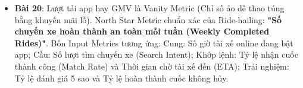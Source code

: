 \begin{dapanbox}
\begin{itemize}
    \item \textbf{Bài 20}: Lượt tải app hay GMV là Vanity Metric (Chỉ số ảo dễ thao túng bằng khuyến mãi lỗ). North Star Metric chuẩn xác của Ride-hailing: \textbf{"Số chuyến xe hoàn thành an toàn mỗi tuần (Weekly Completed Rides)"}. Bốn Input Metrics tương ứng: Cung: Số giờ tài xế online đang bật app; Cầu: Số lượt tìm chuyến xe (Search Intent); Khớp lệnh: Tỷ lệ nhận cuốc thành công (Match Rate) và Thời gian chờ tài xế đến (ETA); Trải nghiệm: Tỷ lệ đánh giá 5 sao và Tỷ lệ hoàn thành cuốc không hủy.
\end{itemize}
\end{dapanbox}
